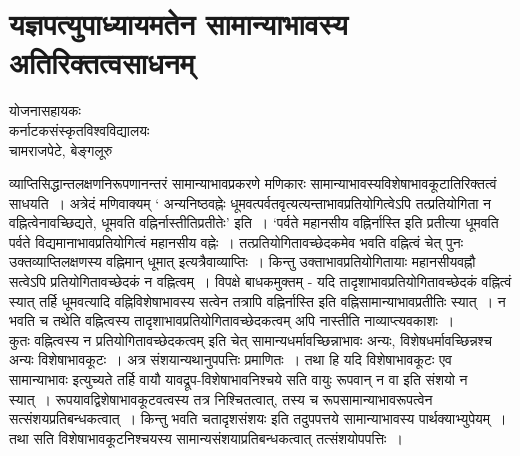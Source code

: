{\fontsize{15}{17}\selectfont
\presetvalues
\chapter{यज्ञपत्युपाध्यायमतेन सामान्याभावस्य अतिरिक्तत्वसाधनम्}

\begin{center}
\smallskip

योजनासहायकः\\
कर्नाटकसंस्कृतविश्वविद्यालयः\\
चामराजपेटे, बेङ्गलूरु
\addrule
\end{center}

व्याप्तिसिद्धान्तलक्षणनिरूपणानन्तरं सामान्याभावप्रकरणे मणिकारः  सामान्याभावस्य\break विशेषाभावकूटातिरिक्तत्वं साधयति~। अत्रेदं मणिवाक्यम् ‘ अन्यनिष्ठवह्नेः धूमवत्पर्वतवृत्यत्यन्ताभावप्रतियोगित्वेऽपि तत्प्रतियोगिता न वह्नित्वेनावच्छिद्यते, धूमवति वह्निर्नास्तीति\break प्रतीतेः’ इति~। ‘पर्वते महानसीय वह्निर्नास्ति इति प्रतीत्या धूमवति पर्वते विद्यमानाभावप्रतियोगित्वं महानसीय वह्नेः~। तत्प्रतियोगितावच्छेदकमेव भवति वह्नित्वं चेत् पुनः उक्तव्याप्तिलक्षणस्य वह्निमान् धूमात् इत्यत्रैवाव्याप्तिः~। किन्तु उक्ताभावप्रतियोगितायाः महानसीयवह्नौ सत्वेऽपि प्रतियोगितावच्छेदकं न वह्नित्वम्~। विपक्षे बाधकमुक्तम् - यदि तादृशाभावप्रतियोगितावच्छेदकं वह्नित्वं स्यात् तर्हि धूमवत्यादि वह्निविशेषाभावस्य सत्वेन तत्रापि वह्निर्नास्ति इति वह्निसामान्याभावप्रतीतिः स्यात्~। न भवति च तथेति वह्नित्वस्य तादृशाभावप्रतियोगितावच्छेदकत्वम् अपि नास्तीति नाव्याप्त्यवकाशः~।  
~\\[0.1cm]
कुतः वह्नित्वस्य न प्रतियोगितावच्छेदकत्वम् इति चेत् सामान्यधर्मावच्छिन्नाभावः अन्यः, विशेषधर्मावच्छिन्नश्च अन्यः विशेषाभावकूटः~। अत्र संशयान्यथानुपपत्तिः प्रमाणितः~। तथा हि यदि विशेषाभावकूटः एव सामान्याभावः इत्युच्यते तर्हि वायौ यावद्रूप-विशेषाभावनिश्चये सति वायुः रूपवान् न वा इति संशयो न स्यात्~। रूपयावद्विशेषाभावकूटवत्वस्य तत्र निश्चित\-त्वात्, तस्य च रूपसामान्याभावरूपत्वेन सत्संशयप्रतिबन्धकत्वात्~। किन्तु भवति च\break तादृशसंशयः इति तदुपपत्तये सामान्याभावस्य पार्थक्याभ्युपेयम्~। तथा सति विशेषाभावकूटनिश्चयस्य सामान्यसंशयाप्रतिबन्धकत्वात् तत्संशयोपपत्तिः~। 
~\\[0.1cm]
}
